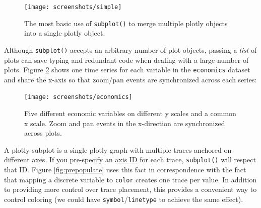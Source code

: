 \documentclass[12pt,]{isuthesis}
\newenvironment{Shaded}{\begin{snugshade}}{\end{snugshade}}
\newcommand{\KeywordTok}[1]{\textcolor[rgb]{0.13,0.29,0.53}{\textbf{{#1}}}}
\newcommand{\DataTypeTok}[1]{\textcolor[rgb]{0.13,0.29,0.53}{{#1}}}
\newcommand{\StringTok}[1]{\textcolor[rgb]{0.31,0.60,0.02}{{#1}}}
\newcommand{\OtherTok}[1]{\textcolor[rgb]{0.56,0.35,0.01}{{#1}}}
\newcommand{\NormalTok}[1]{{#1}}
\begin{document}
\begin{figure}
\centering
\texttt{[image: screenshots/simple]}
\caption{\label{fig:simple}The most basic use of \texttt{subplot()} to merge
multiple plotly objects into a single plotly object.}
\end{figure}

Although \texttt{subplot()} accepts an arbitrary number of plot objects,
passing a \emph{list} of plots can save typing and redundant code when
dealing with a large number of plots. Figure \ref{fig:economics} shows
one time series for each variable in the \texttt{economics} dataset and
share the x-axis so that zoom/pan events are synchronized across each
series:

\begin{Shaded}
\end{Shaded}

\begin{figure}
\centering
\texttt{[image: screenshots/economics]}
\caption{\label{fig:economics}Five different economic variables on different
y scales and a common x scale. Zoom and pan events in the x-direction
are synchronized across plots.}
\end{figure}

A plotly subplot is a single plotly graph with multiple traces anchored
on different axes. If you pre-specify an
\href{https://plot.ly/r/reference/\#scatter-yaxis}{axis ID} for each
trace, \texttt{subplot()} will respect that ID. Figure
\ref{fig:prepopulate} uses this fact in correspondence with the fact
that mapping a discrete variable to \texttt{color} creates one trace per
value. In addition to providing more control over trace placement, this
provides a convenient way to control coloring (we could have
\texttt{symbol}/\texttt{linetype} to achieve the same effect).
\end{document}
